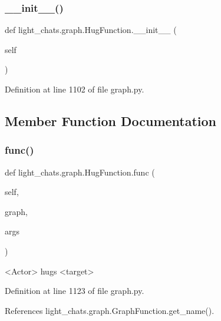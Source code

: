 \subsubsection{\texorpdfstring{\+\_\+\+\_\+init\+\_\+\+\_\+()}{\_\_init\_\_()}}
{\footnotesize\ttfamily def light\+\_\+chats.\+graph.\+Hug\+Function.\+\_\+\+\_\+init\+\_\+\+\_\+ (\begin{DoxyParamCaption}\item[{}]{self }\end{DoxyParamCaption})}



Definition at line 1102 of file graph.\+py.



\subsection{Member Function Documentation}
\mbox{\label{classlight__chats_1_1graph_1_1HugFunction_a581fcc58cb0a76a19a02d8c87d911fb9}} 
\subsubsection{\texorpdfstring{func()}{func()}}
{\footnotesize\ttfamily def light\+\_\+chats.\+graph.\+Hug\+Function.\+func (\begin{DoxyParamCaption}\item[{}]{self,  }\item[{}]{graph,  }\item[{}]{args }\end{DoxyParamCaption})}

\begin{DoxyVerb}<Actor> hugs <target>\end{DoxyVerb}
 

Definition at line 1123 of file graph.\+py.



References light\+\_\+chats.\+graph.\+Graph\+Function.\+get\+\_\+name().

